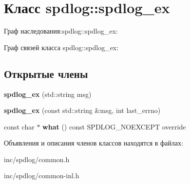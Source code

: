 \hypertarget{classspdlog_1_1spdlog__ex}{}\section{Класс spdlog\+:\+:spdlog\+\_\+ex}
\label{classspdlog_1_1spdlog__ex}


Граф наследования\+:spdlog\+:\+:spdlog\+\_\+ex\+:


Граф связей класса spdlog\+:\+:spdlog\+\_\+ex\+:
\subsection*{Открытые члены}
\begin{DoxyCompactItemize}
\item 
\mbox{\label{classspdlog_1_1spdlog__ex_a378075bd06b87d1e76d65e0300888fef}} 
{\bfseries spdlog\+\_\+ex} (std\+::string msg)
\item 
\mbox{\label{classspdlog_1_1spdlog__ex_a591618b7b4542381f14554dfc4d3e982}} 
{\bfseries spdlog\+\_\+ex} (const std\+::string \&msg, int last\+\_\+errno)
\item 
\mbox{\label{classspdlog_1_1spdlog__ex_a22a66e9f77419c82c9f431623a9da779}} 
const char $\ast$ {\bfseries what} () const S\+P\+D\+L\+O\+G\+\_\+\+N\+O\+E\+X\+C\+E\+PT override
\end{DoxyCompactItemize}


Объявления и описания членов классов находятся в файлах\+:\begin{DoxyCompactItemize}
\item 
inc/spdlog/common.\+h\item 
inc/spdlog/common-\/inl.\+h\end{DoxyCompactItemize}
